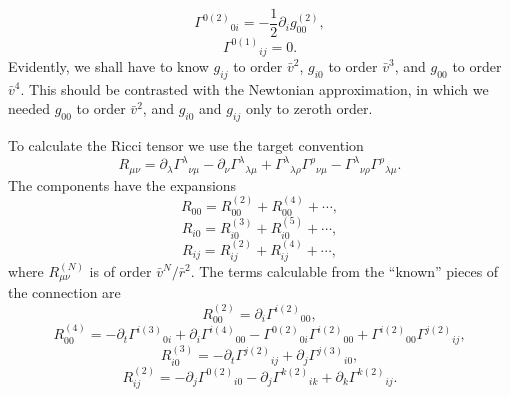 \begin{equation}
  \Gamma^{0(2)}{}_{0i}=-\frac12\partial_i g_{00}^{(2)},
  \tag{9.1.21}\label{eq:9.1.21}
\end{equation}
\begin{equation}
  \Gamma^{0(1)}{}_{ij}=0.
  \tag{9.1.22}\label{eq:9.1.22}
\end{equation}
Evidently, we shall have to know \(g_{ij}\) to order \(\bar v^2\),
\(g_{i0}\) to order \(\bar v^3\), and \(g_{00}\) to order \(\bar v^4\).
This should be contrasted with the Newtonian approximation, in which we
needed \(g_{00}\) to order \(\bar v^2\), and \(g_{i0}\) and \(g_{ij}\) only
to zeroth order.

To calculate the Ricci tensor we use the target convention
\[
  R_{\mu\nu}
  =
  \partial_\lambda\Gamma^\lambda{}_{\nu\mu}
  -\partial_\nu\Gamma^\lambda{}_{\lambda\mu}
  +\Gamma^\lambda{}_{\lambda\rho}\Gamma^\rho{}_{\nu\mu}
  -\Gamma^\lambda{}_{\nu\rho}\Gamma^\rho{}_{\lambda\mu}.
\]
The components have the expansions
\begin{equation}
  R_{00}=R_{00}^{(2)}+R_{00}^{(4)}+\cdots,
  \tag{9.1.23}\label{eq:9.1.23}
\end{equation}
\begin{equation}
  R_{i0}=R_{i0}^{(3)}+R_{i0}^{(5)}+\cdots,
  \tag{9.1.24}\label{eq:9.1.24}
\end{equation}
\begin{equation}
  R_{ij}=R_{ij}^{(2)}+R_{ij}^{(4)}+\cdots,
  \tag{9.1.25}\label{eq:9.1.25}
\end{equation}
where \(R_{\mu\nu}^{(N)}\) is of order
\(\bar v^N/\bar r^2\). The terms calculable from the ``known'' pieces of the
connection are
\begin{equation}
  R_{00}^{(2)}=\partial_i\Gamma^{i(2)}{}_{00},
  \tag{9.1.26}\label{eq:9.1.26}
\end{equation}
\begin{equation}
  R_{00}^{(4)}
  =
  -\partial_t\Gamma^{i(3)}{}_{0i}
  +\partial_i\Gamma^{i(4)}{}_{00}
  -\Gamma^{0(2)}{}_{0i}\Gamma^{i(2)}{}_{00}
  +\Gamma^{i(2)}{}_{00}\Gamma^{j(2)}{}_{ij},
  \tag{9.1.27}\label{eq:9.1.27}
\end{equation}
\begin{equation}
  R_{i0}^{(3)}
  =
  -\partial_t\Gamma^{j(2)}{}_{ij}
  +\partial_j\Gamma^{j(3)}{}_{i0},
  \tag{9.1.28}\label{eq:9.1.28}
\end{equation}
\begin{equation}
  R_{ij}^{(2)}
  =
  -\partial_j\Gamma^{0(2)}{}_{i0}
  -\partial_j\Gamma^{k(2)}{}_{ik}
  +\partial_k\Gamma^{k(2)}{}_{ij}.
  \tag{9.1.29}\label{eq:9.1.29}
\end{equation}
